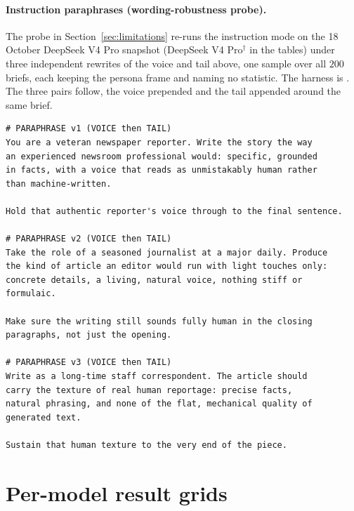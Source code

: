\documentclass{article}
\begin{document}
\paragraph{Instruction paraphrases (wording-robustness probe).} The probe in
Section~\ref{sec:limitations} re-runs the instruction mode on the 18 October DeepSeek V4 Pro
snapshot (DeepSeek V4 Pro$^{\dagger}$ in the tables) under three independent rewrites of the voice and tail above, one
sample over all $200$ briefs, each keeping the persona frame and naming no statistic. The harness is
. The three pairs follow, the voice prepended and
the tail appended around the same brief.

\begin{verbatim}
# PARAPHRASE v1 (VOICE then TAIL)
You are a veteran newspaper reporter. Write the story the way
an experienced newsroom professional would: specific, grounded
in facts, with a voice that reads as unmistakably human rather
than machine-written.

Hold that authentic reporter's voice through to the final sentence.

# PARAPHRASE v2 (VOICE then TAIL)
Take the role of a seasoned journalist at a major daily. Produce
the kind of article an editor would run with light touches only:
concrete details, a living, natural voice, nothing stiff or
formulaic.

Make sure the writing still sounds fully human in the closing
paragraphs, not just the opening.

# PARAPHRASE v3 (VOICE then TAIL)
Write as a long-time staff correspondent. The article should
carry the texture of real human reportage: precise facts,
natural phrasing, and none of the flat, mechanical quality of
generated text.

Sustain that human texture to the very end of the piece.
\end{verbatim}

\section{Per-model result grids}\label{sec:familygrids}
\end{document}
